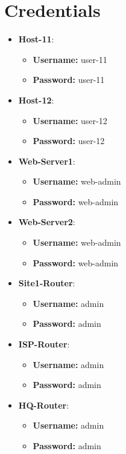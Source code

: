 \section{Credentials}
\begin{itemize}
	\item \textbf{Host-11}:
	\begin{itemize}
		\item \textbf{Username:} user-11
		\item \textbf{Password:} user-11
	\end{itemize}
	\item \textbf{Host-12}:
	\begin{itemize}
		\item \textbf{Username:} user-12
		\item \textbf{Password:} user-12
	\end{itemize}
	\item \textbf{Web-Server1}:
	\begin{itemize}
		\item \textbf{Username:} web-admin
		\item \textbf{Password:} web-admin
	\end{itemize}
	\item \textbf{Web-Server2}:
	\begin{itemize}
		\item \textbf{Username:} web-admin
		\item \textbf{Password:} web-admin
	\end{itemize}
	\item \textbf{Site1-Router}:
	\begin{itemize}
		\item \textbf{Username:} admin
		\item \textbf{Password:} admin
	\end{itemize}
	\item \textbf{ISP-Router}:
	\begin{itemize}
		\item \textbf{Username:} admin
		\item \textbf{Password:} admin
	\end{itemize}
	\item \textbf{HQ-Router}:
	\begin{itemize}
		\item \textbf{Username:} admin
		\item \textbf{Password:} admin
	\end{itemize}
\end{itemize}

